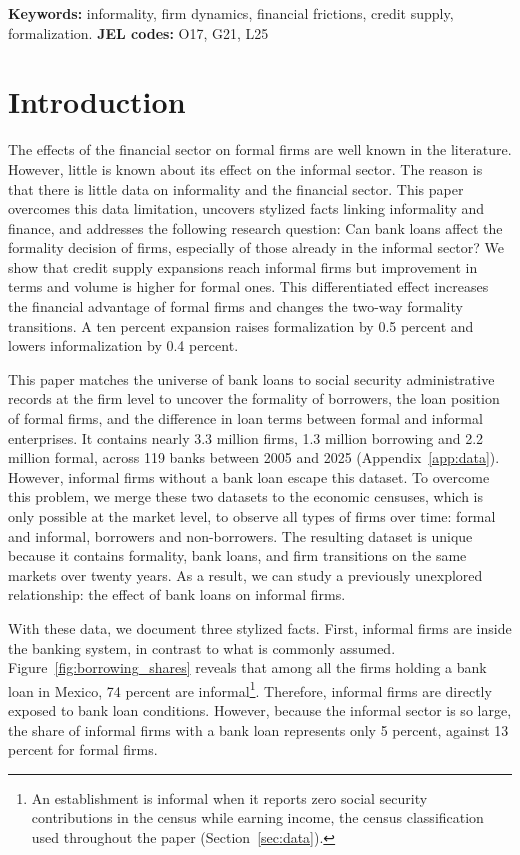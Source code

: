 \documentclass[12pt]{article}
\begin{document}
\noindent\textbf{Keywords:} informality, firm dynamics, financial frictions, credit supply, formalization.
\noindent\textbf{JEL codes:} O17, G21, L25

\vfill

\newpage
{} 

\section{Introduction}
\label{1}

The effects of the financial sector on formal firms are well known in the literature. However, little is known about its effect on the informal sector. The reason is that there is little data on informality and the financial sector. This paper overcomes this data limitation, uncovers stylized facts linking informality and finance, and addresses the following research question: Can bank loans affect the formality decision of firms, especially of those already in the informal sector? We show that credit supply expansions reach informal firms but improvement in terms and volume is higher for formal ones. This differentiated effect increases the financial advantage of formal firms and changes the two-way formality transitions. A ten percent expansion raises formalization by 0.5 percent and lowers informalization by 0.4 percent.

This paper matches the universe of bank loans to social security administrative records at the firm level to uncover the formality of borrowers, the loan position of formal firms, and the difference in loan terms between formal and informal enterprises. It contains nearly  3.3 million firms, 1.3 million borrowing and 2.2 million formal, across 119 banks between 2005 and 2025 (Appendix~\ref{app:data}). However, informal firms without a bank loan escape this dataset. To overcome this problem, we merge these two datasets to the economic censuses, which is only possible at the market level, to observe all types of firms over time: formal and informal, borrowers and non-borrowers. The resulting dataset is unique because it contains formality, bank loans, and firm transitions on the same markets over twenty years. As a result, we can study a previously unexplored relationship: the effect of bank loans on informal firms. 

With these data, we document three stylized facts. First, informal firms are inside the banking system, in contrast to what is commonly assumed. Figure~\ref{fig:borrowing_shares} reveals that among all the firms holding a bank loan in Mexico, 74 percent are informal\footnote{An establishment is informal when it reports zero social security contributions in the census while earning income, the census classification used throughout the paper (Section~\ref{sec:data}).}. Therefore, informal firms are directly exposed to bank loan conditions. However, because the informal sector is so large, the share of informal firms with a bank loan represents only 5 percent, against 13 percent for formal firms.
\end{document}
